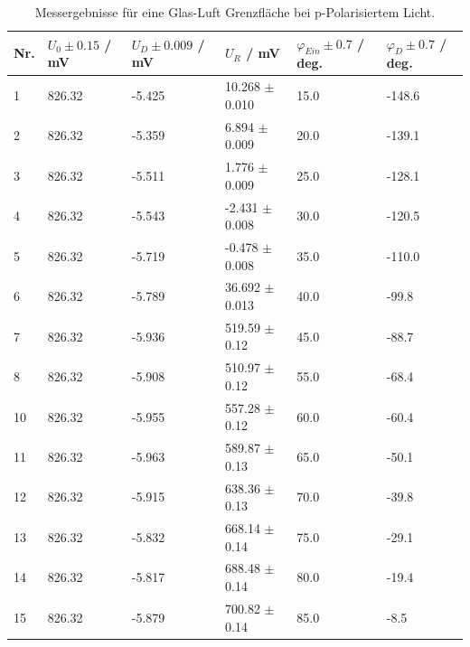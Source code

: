 \documentclass[12pt,a4paper,twoside]{article}
\begin{document}
\begin{table}[H]
    \centering
    \caption{Messergebnisse für eine Glas-Luft Grenzfläche bei p-Polarisiertem Licht. }
    \label{tab:mess glas luft p-pol}
    \begin{tabular}{| l | l | l | l | l | l |}
        \hline
        Nr. & $U_0 \pm 0.15 $ / mV & $U_D \pm 0.009$ / mV & $U_{R}$ / mV & $\varphi_{Ein} \pm 0.7$ / deg. & $\varphi_D \pm 0.7$ / deg.  \\
        \hline
        1  & 826.32 & -5.425 & 10.268 $\pm$ 0.010 & 15.0 & -148.6 \\
        2  & 826.32 & -5.359 & 6.894  $\pm$ 0.009 & 20.0 & -139.1 \\
        3  & 826.32 & -5.511 & 1.776  $\pm$ 0.009 & 25.0 & -128.1 \\
        4  & 826.32 & -5.543 & -2.431 $\pm$ 0.008 & 30.0 & -120.5 \\
        5  & 826.32 & -5.719 & -0.478 $\pm$ 0.008 & 35.0 & -110.0 \\
        6  & 826.32 & -5.789 & 36.692 $\pm$ 0.013 & 40.0 & -99.8  \\
        7  & 826.32 & -5.936 & 519.59 $\pm$ 0.12  & 45.0 & -88.7  \\
        8  & 826.32 & -5.908 & 510.97 $\pm$ 0.12  & 55.0 & -68.4  \\
        10 & 826.32 & -5.955 & 557.28 $\pm$ 0.12  & 60.0 & -60.4  \\
        11 & 826.32 & -5.963 & 589.87 $\pm$ 0.13  & 65.0 & -50.1  \\
        12 & 826.32 & -5.915 & 638.36 $\pm$ 0.13  & 70.0 & -39.8  \\
        13 & 826.32 & -5.832 & 668.14 $\pm$ 0.14  & 75.0 & -29.1  \\
        14 & 826.32 & -5.817 & 688.48 $\pm$ 0.14  & 80.0 & -19.4  \\
        15 & 826.32 & -5.879 & 700.82 $\pm$ 0.14  & 85.0 & -8.5   \\
        \hline
    \end{tabular}
\end{table}
\end{document}
